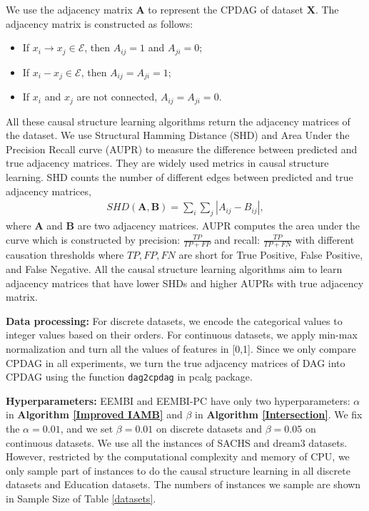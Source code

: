 \documentclass[twoside,11pt]{article}
\begin{document}
We use the adjacency matrix $\mathbf A$ to represent the CPDAG of dataset $\mathbf X$. The adjacency matrix is constructed as follows:
\begin{itemize}
\item If $x_i\to x_j\in\mathcal E$, then $A_{ij}=1$ and $A_{ji}=0$;
\item If $x_i-x_j\in\mathcal E$, then $A_{ij}=A_{ji}=1$;
\item If $x_i$ and $x_j$ are not connected, $A_{ij}=A_{ji}=0$.
\end{itemize}

All these causal structure learning algorithms return the adjacency matrices of the dataset. We use Structural Hamming Distance (SHD) and Area Under the Precision Recall curve (AUPR) to measure the difference between predicted and true adjacency matrices. They are widely used metrics in causal structure learning. SHD counts the number of different edges between predicted and true adjacency matrices, 
\begin{align*}
    SHD(\mathbf A, \mathbf B)=\sum_i\sum_j \left| A_{ij}-B_{ij}\right|,
\end{align*}
where $\mathbf A$ and $\mathbf B$ are two adjacency matrices. AUPR computes the area under the curve which is constructed by precision: $\frac{TP}{TP+FP}$ and recall: $\frac{TP}{TP+FN}$ with different causation thresholds where $TP, FP, FN$ are short for True Positive, False Positive, and False Negative. All the causal structure learning algorithms aim to learn adjacency matrices that have lower SHDs and higher AUPRs with true adjacency matrix. 

\textbf{Data processing:} For discrete datasets, we encode the categorical values to integer values based on their orders. For continuous datasets, we apply min-max normalization and turn all the values of features in [0,1]. Since we only compare CPDAG in all experiments, we turn the true adjacency matrices of DAG into CPDAG using the function \texttt{dag2cpdag} in pcalg package. 

\textbf{Hyperparameters:} EEMBI and EEMBI-PC have only two hyperparameters: $\alpha$ in \textbf{Algorithm \ref{Improved IAMB}} and $\beta$ in \textbf{Algorithm \ref{Intersection}}. We fix the $\alpha=0.01$, and we set $\beta=0.01$ on discrete datasets and $\beta=0.05$ on continuous datasets. We use all the instances of SACHS and dream3 datasets. However, restricted by the computational complexity and memory of CPU, we only sample part of instances to do the causal structure learning in all discrete datasets and Education datasets. The numbers of instances we sample are shown in Sample Size of Table \ref{datasets}. 
\end{document}
